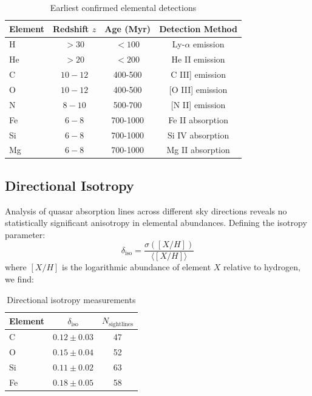 \documentclass[twocolumn,aps,prd,superscriptaddress,nofootinbib]{revtex4-2}
\begin{document}
\begin{table}[htbp]
\centering
\caption{Earliest confirmed elemental detections}
\label{tab:earliest_elements}
\begin{tabular}{lccc}
\toprule
Element & Redshift $z$ & Age (Myr) & Detection Method \\
\midrule
H & $> 30$ & $< 100$ & Ly-$\alpha$ emission \\
He & $> 20$ & $< 200$ & He II emission \\
C & $10-12$ & 400-500 & C III] emission \\
O & $10-12$ & 400-500 & [O III] emission \\
N & $8-10$ & 500-700 & [N II] emission \\
Fe & $6-8$ & 700-1000 & Fe II absorption \\
Si & $6-8$ & 700-1000 & Si IV absorption \\
Mg & $6-8$ & 700-1000 & Mg II absorption \\
\bottomrule
\end{tabular}
\end{table}

\subsection{Directional Isotropy}

Analysis of quasar absorption lines across different sky directions reveals no statistically significant anisotropy in elemental abundances. Defining the isotropy parameter:
\begin{equation}
\delta_{\text{iso}} = \frac{\sigma([X/H])}{\langle [X/H] \rangle}
\end{equation}
where $[X/H]$ is the logarithmic abundance of element $X$ relative to hydrogen, we find:

\begin{table}[htbp]
\centering
\caption{Directional isotropy measurements}
\label{tab:isotropy}
\begin{tabular}{lcc}
\toprule
Element & $\delta_{\text{iso}}$ & $N_{\text{sightlines}}$ \\
\midrule
C & $0.12 \pm 0.03$ & 47 \\
O & $0.15 \pm 0.04$ & 52 \\
Si & $0.11 \pm 0.02$ & 63 \\
Fe & $0.18 \pm 0.05$ & 58 \\
\bottomrule
\end{tabular}
\end{table}
\end{document}
